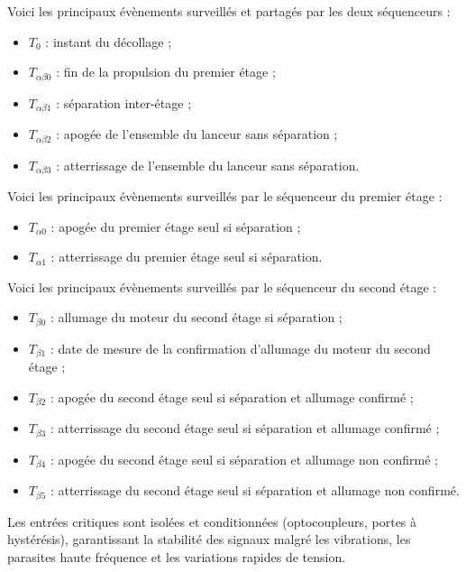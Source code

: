 Voici les principaux évènements surveillés et partagés par les deux séquenceurs :
\begin{itemize}
    \item $T_0$ : instant du décollage ;
    \item $T_{\alpha\beta0}$ : fin de la propulsion du premier étage ;
    \item $T_{\alpha\beta1}$ : séparation inter-étage ;
    \item $T_{\alpha\beta2}$ : apogée de l'ensemble du lanceur sans séparation ;
    \item $T_{\alpha\beta3}$ : atterrissage de l'ensemble du lanceur sans séparation.\\
\end{itemize}

Voici les principaux évènements surveillés par le séquenceur du premier étage :
\begin{itemize}
    \item $T_{\alpha0}$ : apogée du premier étage seul si séparation ;
    \item $T_{\alpha1}$ : atterrissage du premier étage seul si séparation.\\
\end{itemize}

Voici les principaux évènements surveillés par le séquenceur du second étage :
\begin{itemize}
    \item $T_{\beta0}$ : allumage du moteur du second étage si séparation ;
    \item $T_{\beta1}$ : date de mesure de la confirmation d’allumage du moteur du second étage ;
    \item $T_{\beta2}$ : apogée du second étage seul si séparation et allumage confirmé ;
    \item $T_{\beta3}$ : atterrissage du second étage seul si séparation et allumage confirmé ;
    \item $T_{\beta4}$ : apogée du second étage seul si séparation et allumage non confirmé ;
    \item $T_{\beta5}$ : atterrissage du second étage seul si séparation et allumage non confirmé.\\
\end{itemize}


Les entrées critiques sont isolées et conditionnées (optocoupleurs, portes à hystérésis), garantissant la stabilité des signaux
malgré les vibrations, les parasites haute fréquence et les variations rapides de tension.

